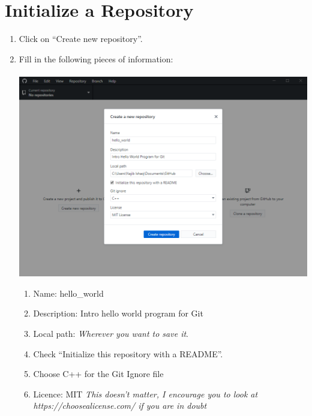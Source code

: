 \documentclass[12pt, letter]{article}
\begin{document}
    \section{Initialize a Repository}
    \begin{enumerate}  
        \item Click on ``Create new repository''.
        
        
        \item Fill in the following pieces of information: \\ \\
        \includegraphics{screenshots/shot2.bmp}
        
        \begin{enumerate}
            
            \item Name: hello\_world
            
            \item Description: Intro hello world program for Git
            
            \item Local path: \emph{Wherever you want to save it}.
            
            \item Check ``Initialize this repository with a README''.
            
            \item Choose C++ for the Git Ignore file
            
            \item Licence: MIT \emph{This doesn't matter, I encourage you to look at https://choosealicense.com/ if you are in doubt}
            

\end{enumerate}
\end{enumerate}
\end{document}

